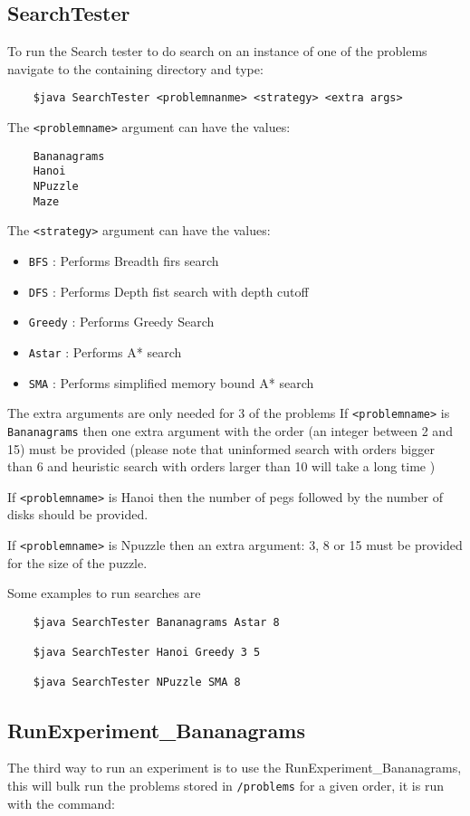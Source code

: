 \documentclass[10pt,letterpaper]{article}
\begin{document}
	\subsection{SearchTester}	
	To run the Search tester to do search on an instance of one of the problems navigate to the containing directory and type:
	
	\begin{lstlisting}
	$java SearchTester <problemnanme> <strategy> <extra args>
	\end{lstlisting}
	The \lstinline!<problemname>! argument can have the values:
	\begin{lstlisting}
	Bananagrams 
	Hanoi
	NPuzzle
	Maze
	\end{lstlisting}
	The \lstinline!<strategy>! argument can have the values:
	\begin{itemize}
	\item \lstinline!BFS!  	: Performs Breadth firs search
	\item\lstinline!DFS!	: Performs Depth fist search with depth cutoff
	\item \lstinline!Greedy!	: Performs Greedy Search
	\item \lstinline!Astar!	: Performs A* search
	\item \lstinline!SMA! 	: Performs simplified memory bound A* search
	\end{itemize}
	The extra arguments are only needed for 3 of the problems
	If \lstinline!<problemname>! is \lstinline!Bananagrams! then one extra argument with the order (an
	integer between 2 and 15) must be provided (please note that uninformed 
	search with orders bigger than 6 and heuristic search with orders larger
	than 10 will take a long time )
	
	If \lstinline!<problemname>! is Hanoi then the number of pegs followed by the number of
	disks should be provided.
	
	If \lstinline!<problemname>! is Npuzzle then an extra argument: 3, 8 or 15
	must be provided for the size of the puzzle.
	
	Some examples to run searches are
	\begin{lstlisting}
	$java SearchTester Bananagrams Astar 8
	
	$java SearchTester Hanoi Greedy 3 5
	
	$java SearchTester NPuzzle SMA 8
	\end{lstlisting}
	
	\subsection{RunExperiment\_Bananagrams}
	The third way to run an experiment is to use the RunExperiment\_Bananagrams, this
	will bulk run the problems stored in \lstinline!/problems! for a given order, it is run
	with the command:
	
\end{document}
